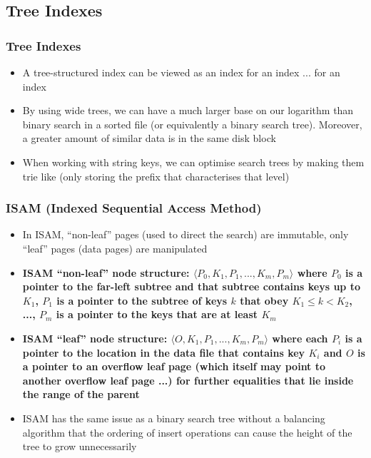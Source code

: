 \documentclass[20pt,a4paper,landscape]{extarticle}
\begin{document}
\begin{flushleft}
\subsection{Tree Indexes}
\subsubsection{Tree Indexes}
\begin{itemize}
\item A tree-structured index can be viewed as an index for an index ... for an index
\item By using wide trees, we can have a much larger base on our logarithm than binary search in a sorted file (or equivalently a binary search tree). Moreover, a greater amount of similar data is in the same disk block
\item When working with string keys, we can optimise search trees by making them trie like (only storing the prefix that characterises that level)
\end{itemize}
\clearpage
\subsubsection{ISAM (Indexed Sequential Access Method)}
\begin{itemize}
\item In ISAM, ``non-leaf'' pages (used to direct the search) are immutable, only ``leaf'' pages (data pages) are manipulated
\item \textbf{ISAM ``non-leaf'' node structure: \boldmath$\langle P_0, K_1, P_1, ..., K_m, P_m \rangle$ where $P_0$ is a pointer to the far-left subtree and that subtree contains keys up to $K_1$, $P_1$ is a pointer to the subtree of keys $k$ that obey $K_1 \leq k < K_2$, ..., $P_m$ is a pointer to the keys that are at least $K_m$}
\item \textbf{ISAM ``leaf'' node structure: \boldmath$\langle O, K_1, P_1, ..., K_m, P_m \rangle$ where each $P_i$ is a pointer to the location in the data file that contains key $K_i$ and $O$ is a pointer to an overflow leaf page (which itself may point to another overflow leaf page ...) for further equalities that lie inside the range of the parent}
\item ISAM has the same issue as a binary search tree without a balancing algorithm that the ordering of insert operations can cause the height of the tree to grow unnecessarily
\end{itemize}

\end{flushleft}
\end{document}
